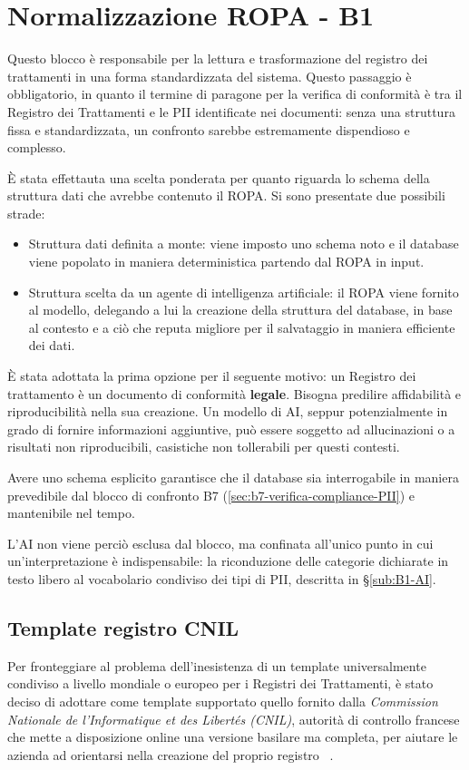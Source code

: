 \section{Normalizzazione ROPA - B1}
\label{sec:b1-ropa}
Questo blocco è responsabile per la lettura e trasformazione del registro dei trattamenti in una forma standardizzata del sistema. Questo passaggio è obbligatorio, in quanto il termine di paragone per la verifica di conformità è tra il Registro dei Trattamenti e le PII identificate nei documenti: senza una struttura fissa e standardizzata, un confronto sarebbe estremamente dispendioso e complesso.

È stata effettauta una scelta ponderata per quanto riguarda lo schema della struttura dati che avrebbe contenuto il ROPA. Si sono presentate due possibili strade:
\begin{itemize}
	\item Struttura dati definita a monte: viene imposto uno schema noto e il database viene popolato in maniera deterministica partendo dal ROPA in input.
	\item Struttura scelta da un agente di intelligenza artificiale: il ROPA viene fornito al modello, delegando a lui la creazione della struttura del database, in base al contesto e a ciò che reputa migliore per il salvataggio in maniera efficiente dei dati.
\end{itemize}
È stata adottata la prima opzione per il seguente motivo: un Registro dei trattamento è un documento di conformità \textbf{legale}. Bisogna predilire affidabilità e riproducibilità nella sua creazione. Un modello di AI, seppur potenzialmente in grado di fornire informazioni aggiuntive, può essere soggetto ad allucinazioni o a risultati non riproducibili, casistiche non tollerabili per questi contesti.

Avere uno schema esplicito garantisce che il database sia interrogabile in maniera prevedibile dal blocco di confronto B7 (\ref{sec:b7-verifica-compliance-PII}) e mantenibile nel tempo.

L'AI non viene perciò esclusa dal blocco, ma confinata all'unico punto in cui un'interpretazione è indispensabile: la riconduzione delle categorie dichiarate in testo libero al vocabolario condiviso dei tipi di PII, descritta in §\ref{sub:B1-AI}.

\subsection{Template registro CNIL}
\label{sub:B1-cnil}
Per fronteggiare al problema dell'inesistenza di un template universalmente condiviso a livello mondiale o europeo per i Registri dei Trattamenti, è stato deciso di adottare come template supportato quello fornito dalla \textit{Commission Nationale de l'Informatique et des Libertés (CNIL)}, autorità di controllo francese che mette a disposizione online una versione basilare ma completa, per aiutare le azienda ad orientarsi nella creazione del proprio registro ~\cite{cnilRegistreTraitement, cnilRegistreModeleBasique}.

